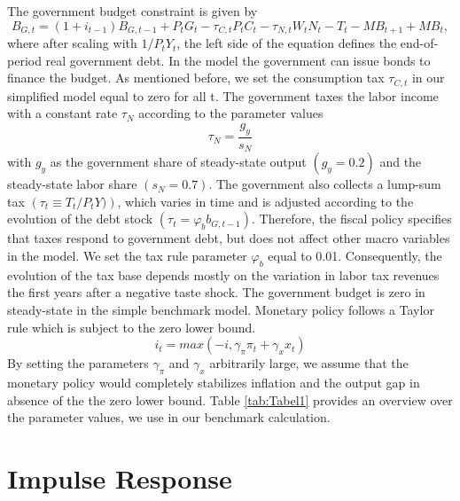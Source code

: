 \documentclass[12pt,a4paper,oneside,titlepage]{article}
\begin{document}
The government budget constraint is given by
\begin{equation}
B_{G,t} = \left(1 + i_{t-1}\right)B_{G,t-1} + P_tG_t - \tau_{C,t}P_tC_t - \tau_{N,t}W_tN_t - T_t - MB_{t+1} + MB_t,  \nonumber
\end{equation}
where after scaling with $1/ P_tY_t$, the left side of the equation defines the end-of-period real government debt. In the model the government can issue bonds to finance the budget. As mentioned before, we set the consumption tax $\tau_{C,t}$ in our simplified model equal to zero for all t. The government taxes the labor income with a constant rate $\tau_N$ according to the parameter values \[\tau_N = \frac{g_y}{s_N}\] with $g_y$ as the government share of steady-state output $\left(g_y = 0.2 \right)$ and the steady-state labor share $\left(s_N = 0.7\right)$.
The government also collects a lump-sum tax $\left(\tau_t \equiv T_t/P_tY)\right)$, which varies in time and is adjusted according to the evolution of the debt stock $\left(\tau_t = \varphi_b b_{G,t-1}\right)$. Therefore, the fiscal policy specifies that taxes respond to government debt, but does not affect other macro variables in the model. We set the tax rule parameter $\varphi_b$ equal to 0.01. Consequently, the evolution of the tax base depends mostly on the variation in labor tax revenues the first years after a negative taste shock. The government budget is zero in steady-state in the simple benchmark model.\newline
Monetary policy follows a Taylor rule which is subject to the zero lower bound.
\begin{equation}
i_t = max \left(-i, \gamma_{\pi} \pi_t + \gamma_x x_t\right)  \nonumber
\end{equation}
By setting the parameters $\gamma_{\pi}$ and $\gamma_x$ arbitrarily large, we assume that the monetary policy would completely stabilizes inflation and the output gap in absence of the the zero lower bound. \newline 
Table \ref{tab:Tabel1} provides an overview over the parameter values, we use in our benchmark calculation.
\bigskip


\section{Impulse Response}
\end{document}
